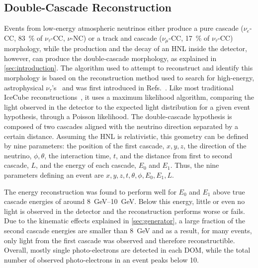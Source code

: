 \documentclass[
    aps,
    prd,
    reprint,
    amsmath,
    amssymb,
    nofootinbib,
    superscriptaddress,
    floatfix
]{revtex4-2}
\newcommand{\gev}{\giga\electronvolt}
\begin{document}
\subsection{\label{sec:taupede} Double-Cascade Reconstruction}

Events from low-energy atmospheric neutrinos either produce a pure cascade ($\nu_{e}$-CC, \SI{83}{\percent} of $\nu_{\tau}$-CC, $\nu$-NC) or a track and cascade ($\nu_{\mu}$-CC, \SI{17}{\percent} of $\nu_{\tau}$-CC) morphology, while the production and the decay of an HNL inside the detector, however, can produce the double-cascade morphology, as explained in \cref{sec:introduction}. The algorithm used to attempt to reconstruct and identify this morphology is based on the reconstruction method used to search for high-energy, astrophysical $\nu_{\tau}$'s~\cite{Abbasi:2020zmr} and was first introduced in Refs.~\cite{PHallen, MUsner}. Like most traditional IceCube reconstructions~\cite{IceCube:2013dkx,IceCube:2024csv}, it uses a maximum likelihood algorithm, comparing the light observed in the detector to the expected light distribution for a given event hypothesis, through a Poisson likelihood.
The double-cascade hypothesis is composed of two cascades aligned with the neutrino direction separated by a certain distance. Assuming the HNL is relativistic, this geometry can be defined by nine parameters: the position of the first cascade, $x, y, z$, the direction of the neutrino, $\phi, \theta$, the interaction time, $t$, and the distance from first to second cascade, $L$, and the energy of each cascade, $E_0$ and $E_1$. Thus, the nine parameters defining an event are $x, y, z, t, \theta, \phi, E_0, E_1, L$.

The energy reconstruction was found to perform well for $E_0$ and $E_1$ above true cascade energies of around \SIrange{8}{10}{\gev}. Below this energy, little or even no light is observed in the detector and the reconstruction performs worse or fails. Due to the kinematic effects explained in \cref{sec:generator}, a large fraction of the second cascade energies are smaller than \SI{8}{\gev} and as a result, for many events, only light from the first cascade was observed and therefore reconstructible. Overall, mostly single photo-electrons are detected in each DOM, while the total number of observed photo-electrons in an event peaks below 10.
\end{document}
